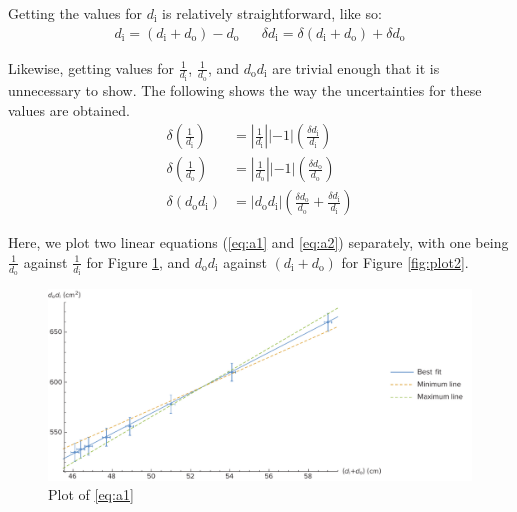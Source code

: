 \documentclass[letter,12pt]{article}
\numberwithin{equation}{section}
\numberwithin{figure}{section}
\numberwithin{table}{section}
\newcommand{\dist}[1] {\(d_{\mathrm{#1}}\)}
\newcommand{\mdist}[1] {d_{\mathrm{#1}}}
\begin{document}
Getting the values for \dist{i} is relatively straightforward, like so:
\begin{align*}
    \mdist{i} = (\mdist{i} + \mdist{o}) - \mdist{o} &&
     \delta\mdist{i} = \delta(\mdist{i} + \mdist{o}) + \delta\mdist{o}
\end{align*}

Likewise, getting values for \(\tfrac{1}{\mdist{i}}\), \(\frac{1}{\mdist{o}}\), and \(\mdist{o} \mdist{i}\) are trivial enough that it is unnecessary to show. The following shows the way the uncertainties for these values are obtained.
\begin{align*}
  \delta \left(\frac{1}{\mdist{i}} \right) &= \left|\frac{1}{\mdist{i}} \right| | -1| \left(\frac{\delta\mdist{i}}{\mdist{i}} \right) \\
  \delta \left(\frac{1}{\mdist{o}} \right) &= \left|\frac{1}{\mdist{o}} \right| | -1| \left(\frac{\delta\mdist{o}}{\mdist{o}} \right) \\
  \delta (\mdist{o}\mdist{i}) &= |\mdist{o}\mdist{i}| \left(\frac{\delta\mdist{o}}{\mdist{o}} + \frac{\delta\mdist{i}}{\mdist{i}}\right)
\end{align*}

Here, we plot two linear equations (\eqref{eq:a1} and \eqref{eq:a2}) separately, with one being \(\frac{1}{\mdist{o}}\) against \(\frac{1}{\mdist{i}}\) for Figure \ref{fig:plot1}, and \(\mdist{o} \mdist{i}\) against \((\mdist{i} + \mdist{o})\) for Figure \ref{fig:plot2}.

\begin{figure}[!hp]
  \centering
  \includegraphics[width=\textwidth]{plot1.pdf}
  \caption{Plot of \eqref{eq:a1}}
  \label{fig:plot1}
\end{figure}
\end{document}
